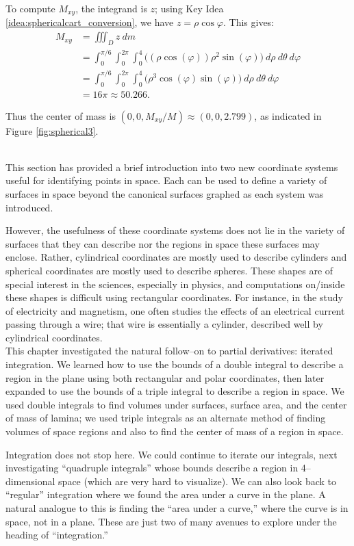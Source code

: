 {To compute $M_{xy}$, the integrand is $z$; using Key Idea \ref{idea:sphericalcart_conversion}, we have $z = \rho\cos\varphi$. This gives:
\begin{align*}
M_{xy} &= \iiint_D z\ dm \\
	&= \int_0^{\pi/6}\int_0^{2\pi}\int_0^4 \big((\rho\cos(\varphi))\rho^2\sin(\varphi)\big) \ d\rho\ d\theta\ d\varphi\\
	&= \int_0^{\pi/6}\int_0^{2\pi}\int_0^4 \big(\rho^3\cos(\varphi)\sin(\varphi)\big) \ d\rho\ d\theta\ d\varphi\\
	&=16\pi \approx 50.266.
\end{align*}

Thus the center of mass is $(0,0,M_{xy}/M) \approx (0,0,2.799)$, as indicated in Figure \ref{fig:spherical3}. 
}\\

This section has provided a brief introduction into two new coordinate systems useful for identifying points in space. Each can be used to define a variety of surfaces in space beyond the canonical surfaces graphed as each system was introduced.

However, the usefulness of these coordinate systems does not lie in the variety of surfaces that they can describe nor the regions in space these surfaces may enclose. Rather,  cylindrical coordinates are mostly used to describe cylinders and spherical coordinates are mostly used to describe spheres. These shapes are of special interest in the sciences, especially in physics, and computations on/inside these shapes is difficult using rectangular coordinates. For instance, in the study of electricity and magnetism, one often studies the effects of an electrical current passing through a wire; that wire is essentially a cylinder, described well by cylindrical coordinates. \\

This chapter investigated the natural follow--on to partial derivatives: iterated integration. We learned how to use the bounds of a double integral to describe a region in the plane using both rectangular and polar coordinates, then later expanded to use the bounds of a triple integral to describe a region in space. We used double integrals to find volumes under surfaces, surface area, and the center of mass of lamina; we used triple integrals as an alternate method of finding volumes of space regions and also to find the center of mass of a region in space.

Integration does not stop here. We could continue to iterate our integrals, next investigating ``quadruple integrals'' whose bounds describe a region in 4--dimensional space (which are very hard to visualize). We can also look back to ``regular'' integration where we found the area under a curve in the plane. A natural analogue to this is finding the ``area under a curve,'' where the curve is in space, not in a plane. These are just two of many avenues to explore under the heading of ``integration.''

